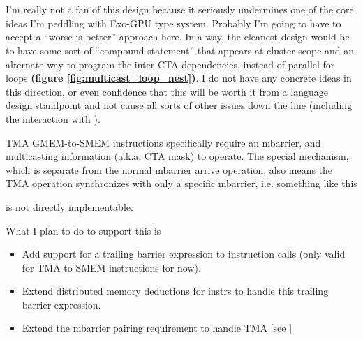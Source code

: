 \begin{figure*}[!b]

\\
\\

\caption{Could we replace the bracketed sections with compound statements that don't involve parallel for loops?} \label{fig:multicast_loop_nest}
\end{figure*}

\filbreak
{}

I'm really not a fan of this design because it seriously undermines one of the core ideas I'm peddling with Exo-GPU type system.
Probably I'm going to have to accept a ``worse is better'' approach here.
In a way, the cleanest design would be to have some sort of ``compound statement'' that appears at cluster scope and an alternate way to program the inter-CTA dependencies, instead of parallel-for loops \textbf{(figure \ref{fig:multicast_loop_nest})}.
I do not have any concrete ideas in this direction, or even confidence that this will be worth it from a language design standpoint and not cause all sorts of other issues down the line (including the interaction with ).

\newpage
{}
\label{ch:tma}

TMA GMEM-to-SMEM instructions specifically require an mbarrier, and multicasting information (a.k.a. CTA mask) to operate.
The special  mechanism, which is separate from the normal mbarrier arrive operation, also means the TMA operation synchronizes with only a specific mbarrier, i.e. something like this



is not directly implementable.

\filbreak
What I plan to do to support this is
\begin{itemize}
  \item Add support for a trailing barrier expression  to instruction calls (only valid for TMA-to-SMEM instructions for now).
  \filbreak
  \item Extend distributed memory deductions for instrs to handle this trailing barrier expression.
  \filbreak
  \item Extend the mbarrier pairing requirement to handle TMA [see ]
\end{itemize}

